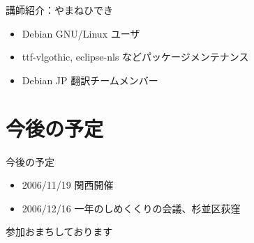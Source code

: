 \documentclass[cjk,dvipdfmx]{beamer}
\begin{document}
\begin{frame}{講師紹介：やまねひでき}
 \begin{itemize}
  \item Debian GNU/Linux ユーザ
  \item ttf-vlgothic, eclipse-nls などパッケージメンテナンス
  \item Debian JP 翻訳チームメンバー
 \end{itemize}
\end{frame}


\section{今後の予定}
\begin{frame}{今後の予定}
\begin{itemize}
 \item 2006/11/19 関西開催
 \item 2006/12/16 一年のしめくくりの会議、杉並区荻窪
\end{itemize}

 参加おまちしております
\end{frame}
\end{document}
